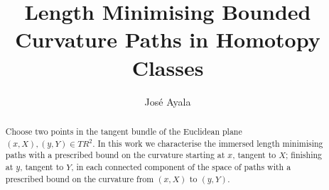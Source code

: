 \documentclass{amsart}
\theoremstyle{definition}
\theoremstyle{remark}
\numberwithin{equation}{section}
\begin{document}
\title{Length Minimising Bounded Curvature Paths in Homotopy Classes}
\author{Jos\'{e} Ayala}
\address{FIA, Universidad Arturo Prat, Iquique, Chile}
\maketitle

\begin{abstract} Choose two points in the tangent bundle of the Euclidean plane $(x,X),(y,Y)\in T{ R}^2$. In this work we characterise the immersed length minimising paths with a prescribed bound on the curvature starting at $x$, tangent to $X$; finishing at $y$, tangent to $Y$, in each connected component of the space of paths with a prescribed bound on the curvature from $(x,X)$ to $(y,Y)$.
\end{abstract}
\end{document}
